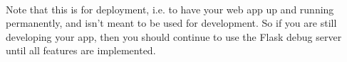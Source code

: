 \documentclass[12pt, a4paper, oneside]{book}
\begin{document}
\paragraph{} Note that this is for deployment, i.e. to have your web app up and running permanently, and isn't meant to be used for development. So if you are still developing your app, then you should continue to use the Flask debug server until all features are implemented.



\backmatter




\end{document}

